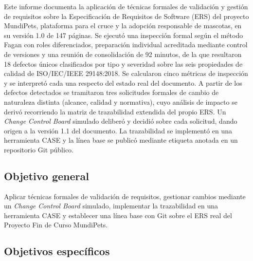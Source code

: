 \documentclass[journal,onecolumn]{IEEEtran}
\begin{document}
	Este informe documenta la aplicación de técnicas formales de
	validación y gestión de requisitos sobre la Especificación de
	Requisitos de Software (ERS) del proyecto MundiPets, plataforma
	para el cruce y la adopción responsable de mascotas, en su versión
	1.0 de 147 páginas. Se ejecutó una inspección formal según el
	método Fagan con roles diferenciados, preparación individual
	acreditada mediante control de versiones y una reunión de
	consolidación de 92 minutos, de la que resultaron 18 defectos
	únicos clasificados por tipo y severidad sobre las seis propiedades
	de calidad de ISO/IEC/IEEE 29148:2018. Se calcularon cinco métricas
	de inspección y se interpretó cada una respecto del estado real del
	documento. A partir de los defectos detectados se tramitaron tres
	solicitudes formales de cambio de naturaleza distinta (alcance,
	calidad y normativa), cuyo análisis de impacto se derivó recorriendo
	la matriz de trazabilidad extendida del propio ERS. Un \emph{Change
		Control Board} simulado deliberó y decidió sobre cada solicitud,
	dando origen a la versión 1.1 del documento. La trazabilidad se
	implementó en una herramienta CASE y la línea base se publicó
	mediante etiqueta anotada en un repositorio Git público.
	
	\subsection{Objetivo general}
	
	Aplicar técnicas formales de validación de requisitos, gestionar
	cambios mediante un \emph{Change Control Board} simulado,
	implementar la trazabilidad en una herramienta CASE y establecer una
	línea base con Git sobre el ERS real del Proyecto Fin de Curso
	MundiPets.
	
	\subsection{Objetivos específicos}
	
\end{document}

